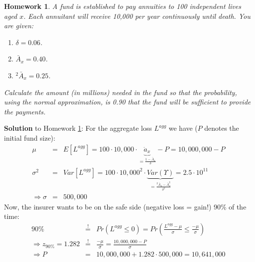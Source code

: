 \documentclass[11pt,fleqn,oneside]{book}
\newtheorem{homework}{Homework}
\begin{document}
\begin{homework}
\label{HW19}
A fund is established to pay annuities to 100 independent lives aged $x$. Each annuitant will receive 10,000 per year continuously until death. You are given:
\begin{enumerate}
\item $\delta=  0.06$.
\item $\bar{A}_x = 0.40$.
\item $^2\bar{A}_x = 0.25$. 
\end{enumerate}
Calculate the amount (in millions) needed in the fund so that the probability, using the normal approximation, is 0.90 that the fund will be sufficient to provide the payments.
\end{homework}

\noindent \textbf{Solution} to Homework \ref{HW19}:
\footnotesize
For the aggregate loss $L^{agg}$ we have ($P$ denotes the initial fund size):
\begin{eqnarray*}
\mu &=& E[L^{agg}] = 100 \cdot 10,000 \cdot \underbrace{\ddot{a}_x}_{=\frac{1-\bar{A}_x}{\delta}} - P = 10,000,000 - P\\
\sigma^2 &=& Var[L^{agg}] = 100\cdot 10,000^2 \cdot \underbrace{Var(\Upsilon)}_{=\frac{{^2\bar{A}_x} - \bar{A}_x^2}{\delta^2}} = 2.5 \cdot 10^{11}\\
\Rightarrow \sigma &=& 500,000
\end{eqnarray*}
Now, the insurer wants to be on the safe side (negative loss = gain!) 90\% of the time:
\begin{eqnarray*}
90\% &\stackrel{!}{=}& Pr ( L^{agg} \leq 0) = Pr(\frac{L^{agg}-\mu}{\sigma} \leq \frac{-\mu}{\sigma})\\
\Rightarrow z_{90\%} =1.282 &\stackrel{!}{=}& \frac{-\mu}{\sigma} = \frac{10,000,000 - P}{\sigma}\\
\Rightarrow P &=& 10,000,000 + 1.282\cdot 500,000 = 10,641,000
\end{eqnarray*}
\normalsize
\end{document}
